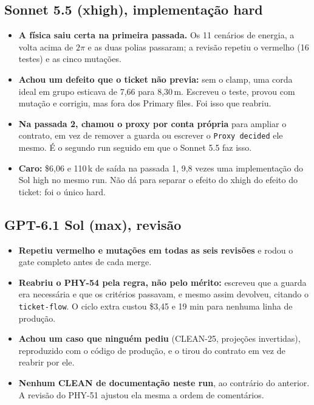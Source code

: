 \documentclass[11pt,a4paper]{article}
\begin{document}
\subsection*{Sonnet 5.5 (xhigh), implementação hard}
\begin{itemize}
  \item \textbf{A física saiu certa na primeira passada.} Os 11 cenários de
        energia, a volta acima de $2\pi$ e as duas polias passaram; a revisão
        repetiu o vermelho (16 testes) e as cinco mutações.
  \item \textbf{Achou um defeito que o ticket não previa:} sem o clamp, uma
        corda ideal em grupo esticava de 7,66 para 8,30\,m. Escreveu o teste,
        provou com mutação e corrigiu, mas fora dos Primary files. Foi isso que
        reabriu.
  \item \textbf{Na passada 2, chamou o proxy por conta própria} para ampliar o
        contrato, em vez de remover a guarda ou escrever o
        \texttt{Proxy decided} ele mesmo. É o segundo run seguido em que o
        Sonnet 5.5 faz isso.
  \item \textbf{Caro:} \$6,06 e 110\,k de saída na passada 1, 9,8 vezes uma
        implementação do Sol high no mesmo run. Não dá para separar o efeito do
        xhigh do efeito do ticket: foi o único hard.
\end{itemize}

\subsection*{GPT-6.1 Sol (max), revisão}
\begin{itemize}
  \item \textbf{Repetiu vermelho e mutações em todas as seis revisões} e rodou
        o gate completo antes de cada merge.
  \item \textbf{Reabriu o PHY-54 pela regra, não pelo mérito:} escreveu que a
        guarda era necessária e que os critérios passavam, e mesmo assim
        devolveu, citando o \texttt{ticket-flow}. O ciclo extra custou \$3,45 e
        19 min para nenhuma linha de produção.
  \item \textbf{Achou um caso que ninguém pediu} (CLEAN-25, projeções
        invertidas), reproduzido com o código de produção, e o tirou do
        contrato em vez de reabrir por ele.
  \item \textbf{Nenhum CLEAN de documentação neste run}, ao contrário do
        anterior. A revisão do PHY-51 ajustou ela mesma a ordem de comentários.
\end{itemize}
\end{document}
